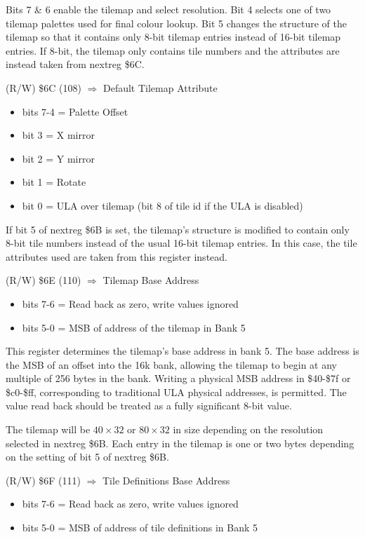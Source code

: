 Bits 7 \& 6 enable the tilemap and select resolution.  Bit 4 selects
one of two tilemap palettes used for final colour lookup.  Bit 5
changes the structure of the tilemap so that it contains only 8-bit
tilemap entries instead of 16-bit tilemap entries.  If 8-bit, the
tilemap only contains tile numbers and the attributes are instead
taken from nextreg \$6C.

(R/W) \$6C (108) $\Rightarrow$ Default Tilemap Attribute
\begin{itemize}
\item bits 7-4 = Palette Offset
\item bit 3 = X mirror
\item bit 2 = Y mirror
\item bit 1 = Rotate
\item bit 0 = ULA over tilemap (bit 8 of tile id if the ULA is disabled)
\end{itemize}

If bit 5 of nextreg \$6B is set, the tilemap's structure is modified
to contain only 8-bit tile numbers instead of the usual 16-bit tilemap
entries.  In this case, the tile attributes used are taken from this
register instead.

(R/W) \$6E (110) $\Rightarrow$ Tilemap Base Address
\begin{itemize}
\item bits 7-6 = Read back as zero, write values ignored
\item bits 5-0 = MSB of address of the tilemap in Bank 5
\end{itemize}

This register determines the tilemap's base address in bank 5.  The
base address is the MSB of an offset into the 16k bank, allowing the
tilemap to begin at any multiple of 256 bytes in the bank.  Writing a
physical MSB address in \$40-\$7f or \$c0-\$ff, corresponding to
traditional ULA physical addresses, is permitted.  The value read back
should be treated as a fully significant 8-bit value.

The tilemap will be $40\times32$ or $80\times32$ in size depending on
the resolution selected in nextreg \$6B.  Each entry in the tilemap is
one or two bytes depending on the setting of bit 5 of nextreg \$6B.

(R/W) \$6F (111) $\Rightarrow$ Tile Definitions Base Address
\begin{itemize}
\item bits 7-6 = Read back as zero, write values ignored
\item bits 5-0 = MSB of address of tile definitions in Bank 5
\end{itemize}

